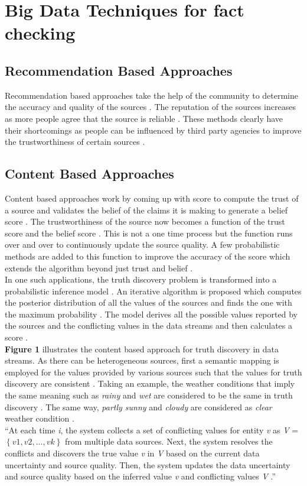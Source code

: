 \documentclass[sigconf]{acmart}
\begin{document}
\section{Big Data Techniques for fact checking}

\subsection{Recommendation Based Approaches}
Recommendation based approaches take the help of the community to determine the accuracy and quality of the sources \cite{Berti-Equille2016}. The reputation of the sources increases as more people agree that the source is reliable \cite{Berti-Equille2016}. These methods clearly have their shortcomings as people can be influenced by third party agencies to improve the trustworthiness of certain sources \cite{Berti-Equille2016}.

\subsection{Content Based Approaches}
Content based approaches work by coming up with score to compute the trust of a source and validates the belief of the claims it is making to generate a belief score \cite{Berti-Equille2016}. The trustworthiness of the source now becomes a function of the trust score and the belief score \cite{Berti-Equille2016}. This is not a one time process but the function runs over and over to continuously update the source quality. A few probabilistic methods are added to this function to improve the accuracy of the score which extends the algorithm beyond just trust and belief \cite{Berti-Equille2016}. \\ In one such applications, the truth discovery problem is transformed into a probabilistic inference model \cite{Zhao2014}. An iterative algorithm is proposed which computes the posterior distribution of all the values of the sources and finds the one with the maximum probability \cite{Zhao2014}. The model derives all the possible values reported by the sources and the conflicting values in the data streams and then calculates a score \cite{Zhao2014}. \\
\textbf{Figure 1} illustrates the content based approach for truth discovery in data streams. As there can be heterogeneous sources, first a semantic mapping is employed for the values provided by various sources such that the values for truth discovery are consistent \cite{Zhao2014}. Taking an example, the weather conditions that imply the same meaning such as {\em rainy} and {\em wet} are considered to be the same in truth discovery \cite{Zhao2014}. The same way, {\em partly sunny} and {\em cloudy} are considered as {\em clear} weather condition \cite{Zhao2014}. \\
``At each time {\em i}, the system collects a set of conflicting
values for entity {\em v} as {\em V} = $\left\{{v1,v2,...,vk}\right\}$ from multiple data sources. Next, the system resolves the conflicts and discovers the true value {\em v} in {\em V} based on the current data uncertainty and source quality. Then, the system updates the data uncertainty and source quality based on the inferred value {\em v} and conflicting values {\em V} \cite{Zhao2014}.''
\end{document}
